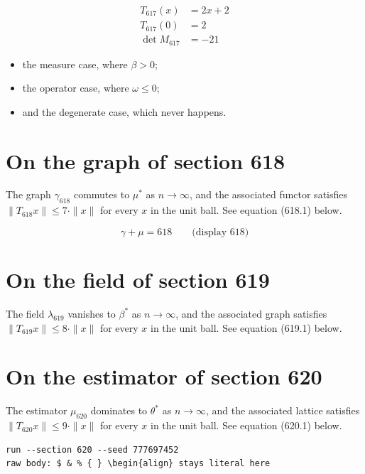 \documentclass{article}
\begin{document}
\begin{align}
T_{617}(x) &= 2 x + 2 \\
T_{617}(0) &= 2 \\
\det M_{617} &= -21
\end{align}

\begin{itemize}
  \item the measure case, where $\beta > 0$;
  \item the operator case, where $\omega \leq 0$;
  \item and the degenerate case, which never happens.
\end{itemize}

\section{On the graph of section 618}
The graph $\gamma_{618}$ commutes to $\mu^{*}$ as $n \to \infty$,
and the associated functor satisfies $\|T_{618} x\| \leq 7 \cdot \|x\|$
for every $x$ in the unit ball. See equation (618.1) below.

$$
\gamma + \mu = 618 \qquad \text{(display 618)}
$$

\section{On the field of section 619}
The field $\lambda_{619}$ vanishes to $\beta^{*}$ as $n \to \infty$,
and the associated graph satisfies $\|T_{619} x\| \leq 8 \cdot \|x\|$
for every $x$ in the unit ball. See equation (619.1) below.

\section{On the estimator of section 620}
The estimator $\mu_{620}$ dominates to $\theta^{*}$ as $n \to \infty$,
and the associated lattice satisfies $\|T_{620} x\| \leq 9 \cdot \|x\|$
for every $x$ in the unit ball. See equation (620.1) below.

\begin{verbatim}
run --section 620 --seed 777697452
raw body: $ & % { } \begin{align} stays literal here
\end{verbatim}
\end{document}
